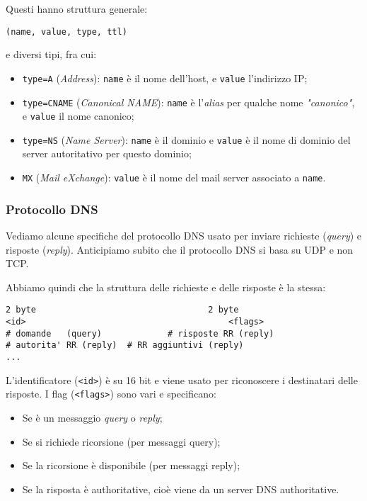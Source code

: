 \documentclass[a4paper,11pt]{article}
\begin{document}
Questi hanno struttura generale:
\begin{lstlisting}[style=shellstyle]
(name, value, type, ttl)
\end{lstlisting}
e diversi tipi, fra cui:
\begin{itemize}
	\item \lstinline|type=A| (\textit{Address}): \lstinline|name| è il nome dell'host, e \lstinline|value| l'indirizzo IP;
	\item \lstinline|type=CNAME| (\textit{Canonical NAME}): \lstinline|name| è l'\textit{alias} per qualche nome \textit{"canonico"}, e \lstinline|value| il nome canonico;
	\item \lstinline|type=NS| (\textit{Name Server}): \lstinline|name| è il dominio e \lstinline|value| è il nome di dominio del server autoritativo per questo dominio;
	\item \lstinline|MX| (\textit{Mail eXchange}): \lstinline|value| è il nome del mail server associato a \lstinline|name|. 
\end{itemize}

\subsubsection{Protocollo DNS}
Vediamo alcune specifiche del protocollo DNS usato per inviare richieste (\textit{query}) e risposte (\textit{reply}).
Anticipiamo subito che il protocollo DNS si basa su UDP e non TCP.

Abbiamo quindi che la struttura delle richieste e delle risposte è la stessa:
\begin{lstlisting}[style=codestyle]	
2 byte									2 byte
<id>										<flags>
# domande	(query)				# risposte RR (reply)
# autorita' RR (reply)	# RR aggiuntivi (reply)
...
\end{lstlisting}

L'identificatore (\lstinline|<id>|) è su 16 bit e viene usato per riconoscere i destinatari delle risposte.
I flag (\lstinline|<flags>|) sono vari e specificano:
\begin{itemize}
	\item Se è un messaggio \textit{query} o \textit{reply};
	\item Se si richiede ricorsione (per messaggi query);
	\item Se la ricorsione è disponibile (per messaggi reply);
	\item Se la risposta è authoritative, cioè viene da un server DNS authoritative.
\end{itemize}
\end{document}
